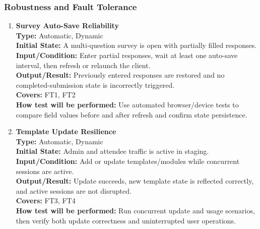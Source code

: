 \documentclass[12pt, titlepage]{article}
\begin{document}
\subsubsection{Robustness and Fault Tolerance}
\begin{enumerate}[label=\bfseries RF-\arabic*:, wide=0pt]
  \item \label{test-RF1} \textbf{Survey Auto-Save Reliability}\\[2mm]
    {\bf Type:} Automatic, Dynamic\\
    {\bf Initial State:} A multi-question survey is open with partially filled responses.\\
    {\bf Input/Condition:} Enter partial responses, wait at least one auto-save interval, then refresh or relaunch the client.\\
    {\bf Output/Result:} Previously entered responses are restored and no completed-submission state is incorrectly triggered.\\
    {\bf Covers:} FT1, FT2\\
    {\bf How test will be performed:} Use automated browser/device tests to compare field values before and after refresh and confirm state persistence.

  \item \label{test-RF2} \textbf{Template Update Resilience}\\[2mm]
    {\bf Type:} Automatic, Dynamic\\
    {\bf Initial State:} Admin and attendee traffic is active in staging.\\
    {\bf Input/Condition:} Add or update templates/modules while concurrent sessions are active.\\
    {\bf Output/Result:} Update succeeds, new template state is reflected correctly, and active sessions are not disrupted.\\
    {\bf Covers:} FT3, FT4\\
    {\bf How test will be performed:} Run concurrent update and usage scenarios, then verify both update correctness and uninterrupted user operations.
\end{enumerate}
\end{document}
